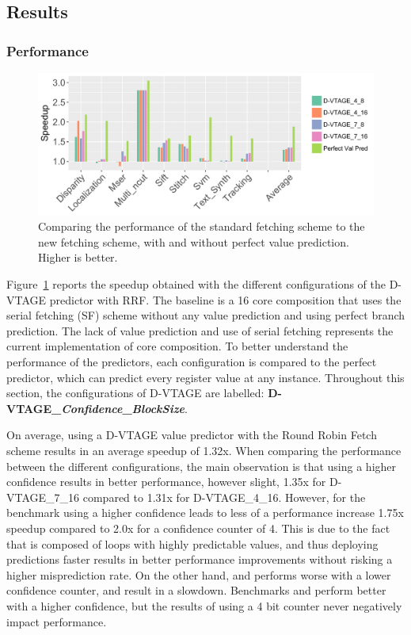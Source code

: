 \subsection{Results}

\subsubsection{Performance}

\begin{figure}[t]
    \centering
    \includegraphics[width=1\textwidth]{chapter3/graphics/vtage_speed2.pdf}
    \caption{Comparing the performance of the standard fetching scheme to the new fetching scheme, with and without perfect value prediction. Higher is better.}
    \label{fig:vtage_perf}
	\vspace{1em}
\end{figure}

Figure~\ref{fig:vtage_perf} reports the speedup obtained with the different configurations of the D-VTAGE predictor with RRF.
The baseline is a 16 core composition that uses the serial fetching (SF) scheme without any value prediction and using perfect branch prediction.
The lack of value prediction and use of serial fetching represents the current implementation of core composition.
To better understand the performance of the predictors, each configuration is compared to the perfect predictor, which can predict every register value at any instance.
Throughout this section, the configurations of D-VTAGE are labelled: \textbf{D-VTAGE\_\textit{Confidence}\_\textit{BlockSize}}.

On average, using a D-VTAGE value predictor with the Round Robin Fetch scheme results in an average speedup of 1.32x.
When comparing the performance between the different configurations, the main observation is that using a higher confidence results in better performance, however slight, 1.35x for D-VTAGE\_7\_16 compared to 1.31x for D-VTAGE\_4\_16.
However, for the benchmark  using a higher confidence leads to less of a performance increase 1.75x speedup compared to 2.0x for a confidence counter of 4.
This is due to the fact that  is composed of loops with highly predictable values, and thus deploying predictions faster results in better performance improvements without risking a higher misprediction rate.
On the other hand,  and  performs worse with a lower confidence counter, and result in a slowdown.
Benchmarks  and  perform better with a higher confidence, but the results of using a 4 bit counter never negatively impact performance.

